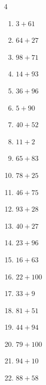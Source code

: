 \begin{multicols}{4}
\begin{enumerate}
  \item $3+61$
        \phantom{$=64$}

  \item $64+27$
        \phantom{$=91$}

  \item $98+71$
        \phantom{$=169$}

  \item $14+93$
        \phantom{$=107$}

  \item $36+96$
        \phantom{$=132$}

  \item $5+90$
        \phantom{$=95$}

  \item $40+52$
        \phantom{$=92$}

  \item $11+2$
        \phantom{$=13$}

  \item $65+83$
        \phantom{$=148$}

  \item $78+25$
        \phantom{$=103$}

  \item $46+75$
        \phantom{$=121$}

  \item $93+28$
        \phantom{$=121$}

  \item $40+27$
        \phantom{$=67$}

  \item $23+96$
        \phantom{$=119$}

  \item $16+63$
        \phantom{$=79$}

  \item $22+100$
        \phantom{$=122$}

  \item $33+9$
        \phantom{$=42$}

  \item $81+51$
        \phantom{$=132$}

  \item $44+94$
        \phantom{$=138$}

  \item $79+100$
        \phantom{$=179$}

  \item $94+10$
        \phantom{$=104$}

  \item $88+58$
        \phantom{$=146$}


\end{enumerate}
\end{multicols}
